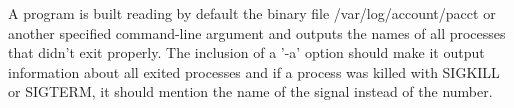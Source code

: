 \documentclass[11pt]{article}
\begin{document}
A program is built reading by default the binary file /var/log/account/pacct or another specified command-line argument and outputs the names of all processes that didn't exit properly. The inclusion of a '-a' option should make it output information about all exited processes and if a process was killed with SIGKILL or SIGTERM, it should mention the name of the signal instead of the number.







\end{document}

